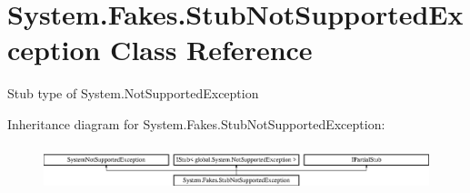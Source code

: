 \hypertarget{class_system_1_1_fakes_1_1_stub_not_supported_exception}{\section{System.\-Fakes.\-Stub\-Not\-Supported\-Exception Class Reference}
\label{class_system_1_1_fakes_1_1_stub_not_supported_exception}
}


Stub type of System.\-Not\-Supported\-Exception 


Inheritance diagram for System.\-Fakes.\-Stub\-Not\-Supported\-Exception\-:\begin{figure}[H]
\begin{center}
\leavevmode
\includegraphics[height=1.305361cm]{class_system_1_1_fakes_1_1_stub_not_supported_exception}
\end{center}
\end{figure}
